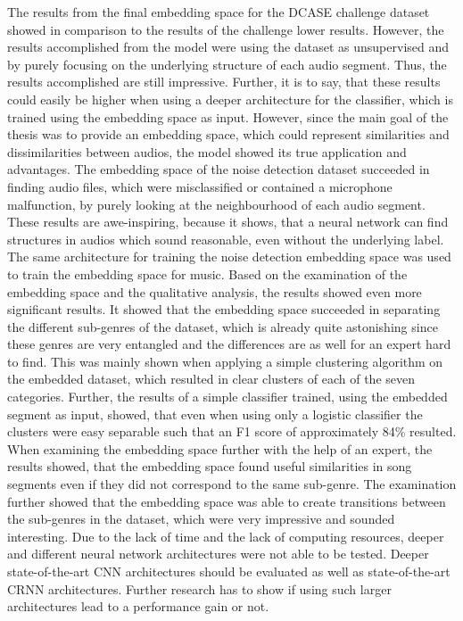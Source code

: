 The results from the final embedding space for the \gls{DCASE} challenge dataset showed in comparison to the results of the challenge lower results. However, the results accomplished from the model were using the dataset as unsupervised and by purely focusing on the underlying structure of each audio segment. Thus, the results accomplished are still impressive. Further, it is to say, that these results could easily be higher when using a deeper architecture for the classifier, which is trained using the embedding space as input. However, since the main goal of the thesis was to provide an embedding space, which could represent similarities and dissimilarities between audios, the model showed its true application and advantages. The embedding space of the noise detection dataset succeeded in finding audio files, which were misclassified or contained a microphone malfunction, by purely looking at the neighbourhood of each audio segment. These results are awe-inspiring, because it shows, that a neural network can find structures in audios which sound reasonable, even without the underlying label.
\newline
\newline
The same architecture for training the noise detection embedding space was used to train the embedding space for music. Based on the examination of the embedding space and the qualitative analysis, the results showed even more significant results. It showed that the embedding space succeeded in separating the different sub-genres of the dataset, which is already quite astonishing since these genres are very entangled and the differences are as well for an expert hard to find. This was mainly shown when applying a simple clustering algorithm on the embedded dataset, which resulted in clear clusters of each of the seven categories. Further, the results of a simple classifier trained, using the embedded segment as input, showed, that even when using only a logistic classifier the clusters were easy separable such that an F1 score of approximately 84\% resulted. When examining the embedding space further with the help of an expert, the results showed, that the embedding space found useful similarities in song segments even if they did not correspond to the same sub-genre. The examination further showed that the embedding space was able to create transitions between the sub-genres in the dataset, which were very impressive and sounded interesting.
\newline
\newline
Due to the lack of time and the lack of computing resources, deeper and different neural network architectures were not able to be tested. Deeper state-of-the-art \gls{CNN} architectures should be evaluated as well as state-of-the-art \gls{CRNN} architectures. Further research has to show if using such larger architectures lead to a performance gain or not.
